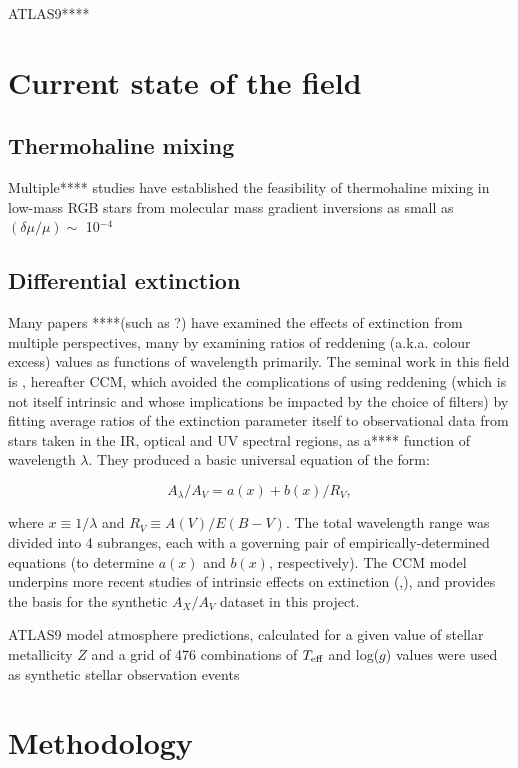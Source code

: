 \documentclass[usenatbib]{mnras}
\begin{document}
ATLAS9****

\section{Current state of the field}
\subsection{Thermohaline mixing}
Multiple**** studies have established the feasibility of thermohaline mixing in low-mass RGB stars from molecular mass gradient inversions as small as $(\delta\mu / \mu) \sim$ 10$^{-4}$
\subsection{Differential extinction}
Many papers ****(such as ?) have examined the effects of extinction from multiple perspectives, many by examining ratios of reddening (a.k.a. colour excess) values as functions of wavelength primarily. The seminal work in this field is \cite{1989ApJ...345..245C}, hereafter CCM, which avoided the complications of using reddening (which is not itself intrinsic and whose implications be impacted by the choice of filters) by fitting average ratios of the extinction parameter itself to observational data from stars taken in the IR, optical and UV spectral regions, as a**** function of wavelength $\lambda$. They produced a basic universal equation of the form:

\begin{equation}
A_{\lambda}/A_{V} = a(x) + b(x)/R_{V},
\label{CCM_general}
\end{equation}

where $x \equiv 1/\lambda$ and $R_{V} \equiv A(V)/E(B-V)$. The total wavelength range was divided into 4 subranges, each with a governing pair of empirically-determined equations (to determine $a(x)$ and $b(x)$, respectively). The CCM model underpins more recent studies of intrinsic effects on extinction (\citet{2018MNRAS.479L.102C},\citet{2008PASP..120..583G}), and provides the basis for the synthetic  $A_{X}/A_{V}$ dataset in this project.

ATLAS9 model atmosphere predictions, calculated for a given value of stellar metallicity $Z$ and a grid of 476 combinations of $T_{\textnormal{eff}}$ and log($g$) values \citep{2004astro.ph..5087C} were used as synthetic stellar observation events
\section{Methodology}
\end{document}
